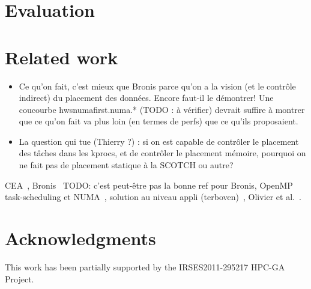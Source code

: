 \documentclass{Styles/llncs}
\begin{document}
\section{Evaluation}

\section{Related work}
\begin{itemize}
\item Ce qu'on fait, c'est mieux que Bronis parce qu'on a la vision
  (et le contrôle indirect) du placement des données. Encore faut-il
  le démontrer! Une coucourbe hwsnumafirst.numa.* (TODO : à vérifier)
  devrait suffire à montrer que ce qu'on fait va plus loin (en termes
  de perfs) que ce qu'ils proposaient.
\item La question qui tue (Thierry ?) : si on est capable de contrôler le
  placement des tâches dans les kprocs, et de contrôler le placement
  mémoire, pourquoi on ne fait pas de placement statique à la SCOTCH
  ou autre?
\end{itemize}

CEA~\cite{DBLP:conf/europar/Clet-OrtegaCP14},
Bronis~\cite{DBLP:journals/sp/OlivierSSP13} TODO: c'est peut-être pas
la bonne ref pour Bronis, OpenMP task-scheduling et
NUMA~\cite{DBLP:journals/corr/Tahan14}, solution au niveau appli
(terboven)~\cite{DBLP:conf/europar/TerbovenSCM12}, Olivier et al.~\cite{DBLP:journals/ijhpca/OlivierPWSP12}.


\section*{Acknowledgments}

This work has been partially supported by the IRSES2011-295217
HPC-GA Project.

  \small 
  
\end{document}
